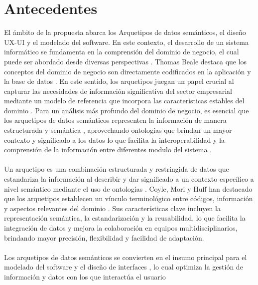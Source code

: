 \documentclass[12pt,a4paper]{article}
\begin{document}
\section{Antecedentes}
\label{sec:5}
El ámbito de la propuesta abarca los Arquetipos de datos semánticos, el diseño UX-UI y el modelado del software. En este contexto, el desarrollo de un sistema informático se fundamenta en la comprensión del dominio de negocio, el cual puede ser abordado desde diversas perspectivas
\cite{Moner2018}
\cite{Kopanitsa2015}
. Thomas Beale destaca que los conceptos del dominio de negocio son directamente codificados en la aplicación y la base de datos
\cite{Cosenz2017}
. En este sentido, los arquetipos juegan un papel crucial al capturar las necesidades de información significativa del sector empresarial mediante un modelo de referencia que incorpora las características estables del dominio
\cite{CardosodeMoraes2016}
\cite{Stavrakos2016}
. Para un análisis más profundo del dominio de negocio, es esencial que los arquetipos de datos semánticos representen la información de manera estructurada y semántica
\cite{Piho2015}
, aprovechando ontologías que brindan un mayor contexto y significado a los datos lo que facilita la interoperabilidad y la comprensión de la información entre diferentes modulo del sistema
\cite{Marco-Ruiz2015}
\cite{Cosenz2017}
\cite{Piho2015}
.
\\\\
Un arquetipo es una combinación estructurada y restringida de datos que estandariza la información al describir y dar significado a un contexto específico a nivel semántico mediante el uso de ontologías
\cite{Kopanitsa2015a}
\cite{Barbieri2013}
\cite{Menárguez-Tortosa2013}
. Coyle, Mori y Huff han destacado que los arquetipos establecen un vínculo terminológico entre códigos, información y aspectos relevantes del dominio
\cite{Barbieri2013}
\cite{Stavrakos2016}
\cite{MartínezCosta2011}
. Sus características clave incluyen la representación semántica, la estandarización y la reusabilidad, lo que facilita la integración de datos y mejora la colaboración en equipos multidisciplinarios, brindando mayor precisión, flexibilidad y facilidad de adaptación. 
\\\\
Los arquetipos de datos semánticos se convierten en el insumo principal para el modelado del software y el diseño de interfaces
\cite{MartínezCosta2011}
\cite{Qanbari2016}
\cite{JansenBosch}
, lo cual optimiza la gestión de información y datos con los que interactúa el usuario
\end{document}
